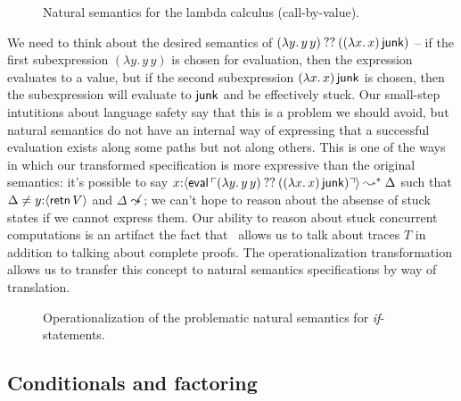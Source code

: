 \begin{figure}[t]
\begin{minipage}[b]{0.45\linewidth}
\end{minipage}
\hspace{0.5cm}
\begin{minipage}[b]{0.55\linewidth}
\end{minipage}
\caption{Natural semantics for the lambda calculus (call-by-value).}
\label{fig:ns-arb}
\end{figure}

We need to think about the desired semantics of $(\lambda y.\,y\,y)
\mathbin{??} ((\lambda x.\,x)\,{\sf junk})$ -- if the first subexpression
$(\lambda y.\,y\,y)$ is chosen for evaluation, then the expression
evaluates to a value, but if the second subexpression $(\lambda
x.\,x)\,{\sf junk}$ is chosen, then the subexpression will evaluate to
${\sf junk}$ and be effectively stuck. Our small-step intutitions
about language safety say that this is a problem we should avoid, but
natural semantics do not have an internal way of expressing that a
successful evaluation exists along some paths but not along others.
This is one of the ways in which our transformed specification is more
expressive than the original semantics: it's possible to say
$x{:}\langle {{\sf eval}\,{\ulcorner{(\lambda y.\,y\,y) \mathbin{??}((\lambda
    x.\,x)\,{\sf junk})}\urcorner}} \rangle \leadsto^* \Delta$ such that $\Delta \neq
y{:}\langle {{\sf retn}\,V} \rangle$ and $\Delta \not\leadsto$; we can't hope to
reason about the absense of stuck states if we cannot express
them. Our ability to reason about stuck concurrent computations is an
artifact the fact that \sls~allows us to talk about traces $T$ in
addition to talking about complete proofs.  The operationalization
transformation allows us to transfer this concept to natural semantics
specifications by way of translation.

\begin{figure}[t]
\caption{Operationalization of the problematic natural semantics for {\it if}-statements.}
\label{fig:sls-bad-ite}
\end{figure}

\subsection{Conditionals and factoring}

